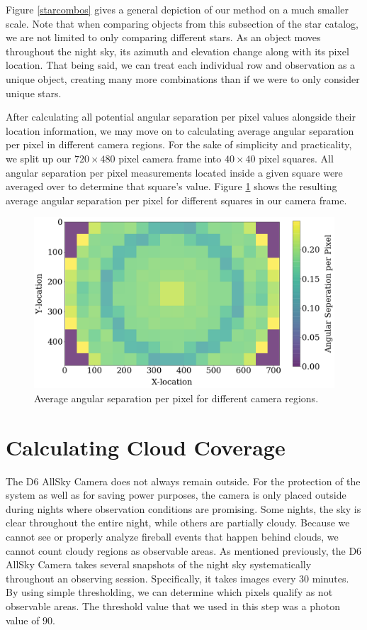 Figure \ref{starcombos} gives a general depiction of our method on a much smaller scale.
Note that when comparing objects from this subsection of the star catalog, we are not limited to only comparing different stars.
As an object moves throughout the night sky, its azimuth and elevation change along with its pixel location.
That being said, we can treat each individual row and observation as a unique object, creating many more combinations than if we were to only consider unique stars.

After calculating all potential angular separation per pixel values alongside their location information, we may move on to calculating average angular separation per pixel in different camera regions.
For the sake of simplicity and practicality, we split up our $720 \times 480$ pixel camera frame into $40 \times 40$ pixel squares.  
All angular separation per pixel measurements located inside a given square were averaged over to determine that square's value.
Figure \ref{colorful} shows the resulting average angular separation per pixel for different squares in our camera frame.

\begin{figure}[ht!]
  \centering
  \includegraphics[scale=0.35]{images/boxes_colored.png}
  \caption{Average angular separation per pixel for different camera regions.}
  \label{colorful}
\end{figure}


\section{Calculating Cloud Coverage}

The D6 AllSky Camera does not always remain outside.
For the protection of the system as well as for saving power purposes, the camera is only placed outside during nights where observation conditions are promising.
Some nights, the sky is clear throughout the entire night, while others are partially cloudy.
Because we cannot see or properly analyze fireball events that happen behind clouds, we cannot count cloudy regions as observable areas.
As mentioned previously, the D6 AllSky Camera takes several snapshots of the night sky systematically throughout an observing session.
Specifically, it takes images every $30$ minutes.
By using simple thresholding, we can determine which pixels qualify as not observable areas.
The threshold value that we used in this step was a photon value of $90$.

